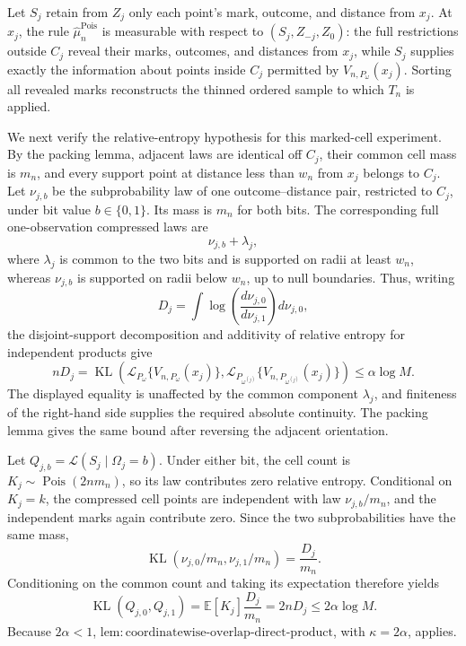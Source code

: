 Let \(S_j\) retain from \(Z_j\) only each point's mark, outcome, and distance from \(x_j\).  At \(x_j\), the rule \(\widehat\mu_n^{\mathrm{Pois}}\) is measurable with respect to \((S_j,Z_{-j},Z_0)\): the full restrictions outside \(C_j\) reveal their marks, outcomes, and distances from \(x_j\), while \(S_j\) supplies exactly the information about points inside \(C_j\) permitted by \(V_{n,P_\omega}(x_j)\).  Sorting all revealed marks reconstructs the thinned ordered sample to which \(T_n\) is applied.

We next verify the relative-entropy hypothesis for this marked-cell experiment.  By the packing lemma, adjacent laws are identical off \(C_j\), their common cell mass is \(m_n\), and every support point at distance less than \(w_n\) from \(x_j\) belongs to \(C_j\).  Let \(\nu_{j,b}\) be the subprobability law of one outcome--distance pair, restricted to \(C_j\), under bit value \(b\in\{0,1\}\).  Its mass is \(m_n\) for both bits.  The corresponding full one-observation compressed laws are
\[
 \nu_{j,b}+\lambda_j,
\]
where \(\lambda_j\) is common to the two bits and is supported on radii at least \(w_n\), whereas \(\nu_{j,b}\) is supported on radii below \(w_n\), up to null boundaries.  Thus, writing
\[
 D_j=\int\log\!\left(\frac{d\nu_{j,0}}{d\nu_{j,1}}\right)d\nu_{j,0},
\]
the disjoint-support decomposition and additivity of relative entropy for independent products give
\[
 nD_j
 =\operatorname{KL}\!\left(
 \mathcal L_{P_\omega}\{V_{n,P_\omega}(x_j)\},
 \mathcal L_{P_{\omega^{(j)}}}\{V_{n,P_{\omega^{(j)}}}(x_j)\}
 \right)
 \leq\alpha\log M.
\]
The displayed equality is unaffected by the common component \(\lambda_j\), and finiteness of the right-hand side supplies the required absolute continuity.  The packing lemma gives the same bound after reversing the adjacent orientation.

Let \(Q_{j,b}=\mathcal L(S_j\mid\Omega_j=b)\).  Under either bit, the cell count is \(K_j\sim\operatorname{Pois}(2nm_n)\), so its law contributes zero relative entropy.  Conditional on \(K_j=k\), the compressed cell points are independent with law \(\nu_{j,b}/m_n\), and the independent marks again contribute zero.  Since the two subprobabilities have the same mass,
\[
 \operatorname{KL}(\nu_{j,0}/m_n,\nu_{j,1}/m_n)=\frac{D_j}{m_n}.
\]
Conditioning on the common count and taking its expectation therefore yields
\[
 \operatorname{KL}(Q_{j,0},Q_{j,1})
 =\mathbb E[K_j]\frac{D_j}{m_n}
 =2nD_j
 \leq2\alpha\log M.
\]
Because \(2\alpha<1\), \(\mathrm{lem:coordinatewise\text{-}overlap\text{-}direct\text{-}product}\), with \(\kappa=2\alpha\), applies.

